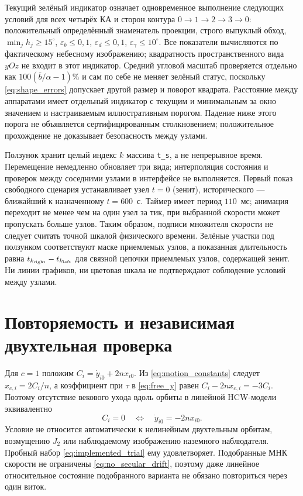\documentclass[a4paper,12pt]{article}
\begin{document}
Текущий зелёный индикатор означает одновременное выполнение
следующих условий для всех четырёх КА и сторон контура
$0\to1\to2\to3\to0$: положительный определённый
знаменатель проекции, строго выпуклый обход,
$\min_j h_j\geq15^\circ$,
$\varepsilon_b\leq0{,}1$,
$\varepsilon_d\leq0{,}1$,
$\varepsilon_\gamma\leq10^\circ$.
Все показатели вычисляются по фактическому небесному
изображению; квадратность пространственного вида $yOz$
не входит в этот индикатор. Средний угловой масштаб
проверяется отдельно как $100(\bar b/\alpha-1)\%$
и сам по себе не меняет зелёный статус, поскольку
\eqref{eq:shape_errors} допускает другой размер
и поворот квадрата. Расстояние между аппаратами имеет
отдельный индикатор с текущим и минимальным за окно
значением и настраиваемым иллюстративным порогом.
Падение ниже этого порога не объявляется
сертифицированным столкновением; положительное прохождение
не доказывает безопасность между узлами.

Ползунок хранит целый индекс $k$ массива \texttt{t\_s},
а не непрерывное время. Перемещение немедленно
обновляет три вида; интерполяция состояния и проверок
между соседними узлами в интерфейсе не выполняется.
Первый показ свободного сценария устанавливает узел
$t=0$ (зенит), исторического --- ближайший к назначенному
$t=600$~с. Таймер имеет период $110$~мс;
анимация переходит не менее чем на один узел за тик,
при выбранной скорости может пропускать больше узлов.
Таким образом, подписи множителя скорости не следует
считать точной шкалой физического времени.
Зелёные участки под ползунком соответствуют маске
приемлемых узлов, а показанная длительность равна
$t_{k_{\rm right}}-t_{k_{\rm left}}$
для связной цепочки приемлемых узлов, содержащей зенит.
Ни линии графиков, ни цветовая шкала не подтверждают
соблюдение условий между узлами.

\section{Повторяемость и независимая двухтельная проверка}
\label{sec:two_body_check}

Для $c=1$ положим
$C_i=\dot y_{i0}+2nx_{i0}$. Из
\eqref{eq:motion_constants} следует $x_{c,i}=2C_i/n$,
а коэффициент при $\tau$ в \eqref{eq:free_y}
равен $C_i-2nx_{c,i}=-3C_i$. Поэтому отсутствие
векового ухода вдоль орбиты в линейной HCW-модели
эквивалентно
\begin{equation}
C_i=0
\quad\Longleftrightarrow\quad
\dot y_{i0}=-2nx_{i0}.
\label{eq:no_secular_drift}
\end{equation}
Условие не относится автоматически к нелинейным
двухтельным орбитам, возмущению $J_2$ или
наблюдаемому изображению наземного наблюдателя.
Пробный набор \eqref{eq:implemented_trial} ему удовлетворяет.
Подобранные МНК скорости не ограничены
\eqref{eq:no_secular_drift}, поэтому даже линейное
относительное состояние подобранного варианта
не обязано повториться через один виток.
\end{document}
